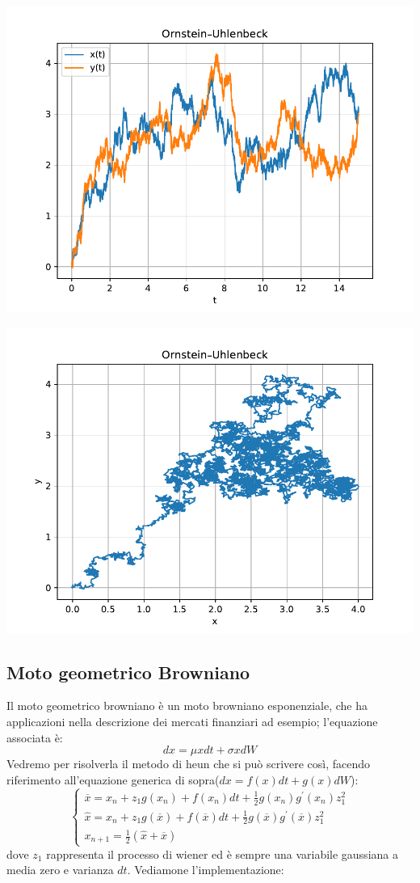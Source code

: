 \documentclass[10pt,a4paper]{article}
\begin{document}
\begin{multicols}{2}


\includegraphics[scale=0.55]{img/OU_1.pdf}


\includegraphics[scale=0.55]{img/OU_2.pdf}


\end{multicols}

\subsection{Moto geometrico Browniano}
Il moto geometrico browniano è un moto browniano esponenziale, che ha applicazioni nella descrizione dei mercati finanziari ad esempio; l'equazione associata è:
\[
dx = \mu x dt + \sigma x dW
\]
Vedremo per risolverla il metodo di heun che si può scrivere così, facendo riferimento all'equazione generica di sopra($dx = f(x) dt + g(x) dW$):
\[
\begin{cases}
\overline{x} = x_n + z_1 g(x_n) + f(x_n) dt + \frac{1}{2} g(x_n)g^{'}(x_n) z_1^2 \\
\hat{x} = x_n + z_1 g(\overline{x}) + f(\overline{x}) dt + \frac{1}{2} g(\overline{x})g^{'}(\overline{x}) z_1^2 \\
x_{n+1} = \frac{1}{2}( \hat{x} + \overline{x} )
\end{cases}
\]
dove $z_1$ rappresenta il processo di wiener ed è sempre una variabile gaussiana a media zero e varianza $dt$. Vediamone l'implementazione:
\end{document}
